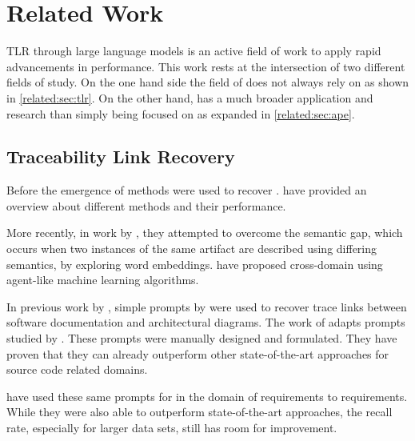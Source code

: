 \chapter{Related Work}
\Acl{TLR} through large language models is an active field of work to apply rapid advancements in \LLM performance.
This work rests at the intersection of two different fields of study.
On the one hand side the field of \TLR does not always rely on \LLMs as shown in \autoref{related:sec:tlr}.
On the other hand, \APE has a much broader application and research than simply being focused on \TLR as expanded in \autoref{related:sec:ape}.


\section{Traceability Link Recovery}
\label{related:sec:tlr}

Before the emergence of \LLMs \IR methods were used to recover \TLs.
 have provided an overview about different \IR methods and their performance. 

More recently, in work by , they attempted to overcome the semantic gap, which occurs when two instances of the same artifact are described using differing semantics, by exploring word embeddings.
 have proposed cross-domain \TLR using agent-like machine learning algorithms.



In previous work by , simple prompts by  were used to recover trace links between software documentation and architectural diagrams.
The work of \citeauthor{ewald2024RetrievalAugmentedLarge} adapts prompts studied by .
These prompts were manually designed and formulated.
They have proven that they can already outperform other state-of-the-art approaches for source code related \TLR domains.

 have used these same prompts for \TLR in the domain of requirements to requirements.
While they were also able to outperform state-of-the-art approaches, the recall rate, especially for larger data sets, still has room for improvement.

